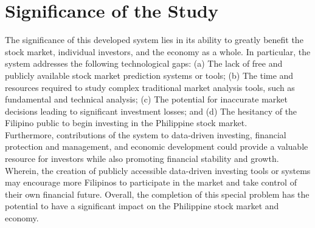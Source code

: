 \section{Significance of the Study}
\label{sec:significance}
The significance of this developed system lies in its ability to greatly benefit 
the stock market, individual investors, and the economy as a whole.
In particular, the system addresses the following technological gaps:
(a) The lack of free and publicly available stock market prediction systems or tools;
(b) The time and resources required to study complex traditional 
market analysis tools, such as fundamental and technical analysis;
(c) The potential for inaccurate market decisions leading to significant 
investment losses; and
(d) The hesitancy of the Filipino public to begin 
investing in the Philippine stock market.
\\

Furthermore, contributions of the system to data-driven investing, financial protection 
and management, and economic development could provide a valuable resource for 
investors while also promoting financial stability and growth. Wherein, 
the creation of publicly accessible data-driven investing tools or systems may encourage 
more Filipinos to participate in the market and take control of their own 
financial future. Overall, the completion of this special problem has the 
potential to have a significant impact on the Philippine stock market and economy.
\\

